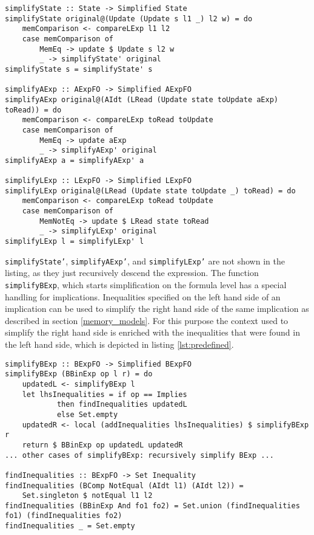 \documentclass[12pt]{article}
\begin{document}
\begin{minipage}{\linewidth}
\begin{lstlisting}[style=c0, caption=implementation of the simplification rules, label=lst:simplification]
simplifyState :: State -> Simplified State
simplifyState original@(Update (Update s l1 _) l2 w) = do
    memComparison <- compareLExp l1 l2
    case memComparison of
        MemEq -> update $ Update s l2 w
        _ -> simplifyState' original
simplifyState s = simplifyState' s

simplifyAExp :: AExpFO -> Simplified AExpFO
simplifyAExp original@(AIdt (LRead (Update state toUpdate aExp) toRead)) = do
    memComparison <- compareLExp toRead toUpdate
    case memComparison of
        MemEq -> update aExp
        _ -> simplifyAExp' original
simplifyAExp a = simplifyAExp' a

simplifyLExp :: LExpFO -> Simplified LExpFO
simplifyLExp original@(LRead (Update state toUpdate _) toRead) = do
    memComparison <- compareLExp toRead toUpdate
    case memComparison of
        MemNotEq -> update $ LRead state toRead 
        _ -> simplifyLExp' original
simplifyLExp l = simplifyLExp' l
\end{lstlisting}
\end{minipage}


\texttt{simplifyState'}, \texttt{simplifyAExp'}, and \texttt{simplifyLExp'} are not shown in the listing, as they just recursively descend the expression.
The function \texttt{simplifyBExp}, which starts simplification on the formula level has a special handling for implications. 
Inequalities specified on the left hand side of an implication can be used to simplify the right hand side of the same implication as described in section \ref{memory_models}.
For this purpose the context used to simplify the right hand side is enriched with the inequalities that were found in the left hand side, which is depicted in listing \ref{lst:predefined}.

\begin{minipage}{\linewidth}
\begin{lstlisting}[style=c0, caption=searching for predefined inequalities, label=lst:predefined]
simplifyBExp :: BExpFO -> Simplified BExpFO
simplifyBExp (BBinExp op l r) = do
    updatedL <- simplifyBExp l
    let lhsInequalities = if op == Implies 
            then findInequalities updatedL 
            else Set.empty
    updatedR <- local (addInequalities lhsInequalities) $ simplifyBExp r
    return $ BBinExp op updatedL updatedR
... other cases of simplifyBExp: recursively simplify BExp ...

findInequalities :: BExpFO -> Set Inequality
findInequalities (BComp NotEqual (AIdt l1) (AIdt l2)) = 
    Set.singleton $ notEqual l1 l2
findInequalities (BBinExp And fo1 fo2) = Set.union (findInequalities fo1) (findInequalities fo2)
findInequalities _ = Set.empty
\end{lstlisting}
\end{minipage}
\end{document}

